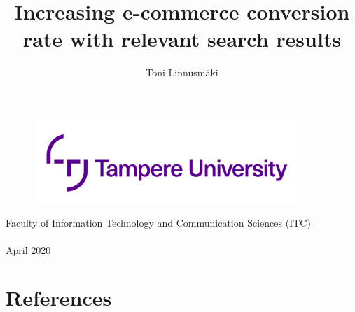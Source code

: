 \documentclass[12pt,a4paper,english]{tunithesis}
\author{Toni Linnusmäki}
\title{Increasing e-commerce conversion rate with relevant search results} %
\begin{document}
\makeatletter


%
\thispagestyle{empty}
\vspace*{-.5cm}\noindent

\begin{figure}
    \vspace{-1.3cm}
    \advance\leftskip-2.5cm
    \noindent\includegraphics{tunilogo.png}
\end{figure}
 
\vspace{2.5cm}
\begin{flushright}
\noindent\textsf{\LARGE{\@author}}

\noindent\vspace{0.5cm}

\noindent\Huge{\textsf{\textbf{\textcolor{tunipurple}{\@title}}}}
\end{flushright}
\vspace{12.7cm} %

\begin{flushright}  
    \begin{spacing}{1.0}
        \textsf{Faculty of Information Technology and Communication Sciences (ITC)\\
        \@thesistype\\
        April 2020}
    \end{spacing}
\end{flushright}



\clearpage



\setcounter{tocdepth}{3}              %
\tableofcontents                      %
\clearpage




% 

%
%
\clearpage

\chapter{References}
\printbibliography[heading=none]
\end{document}
